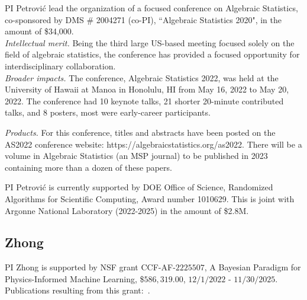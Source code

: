 \documentclass[11pt]{NSFamsart}
\begin{document}
PI Petrovi\'c  lead the organization of a focused 
 conference on Algebraic Statistics, co-sponsored by DMS \# 2004271 (co-PI), ``Algebraic Statistics 2020", in the amount of  \$34,000. 
\\
\emph{Intellectual merit.} Being the third large US-based meeting focused solely on the field of algebraic statistics,  the conference has provided a focused opportunity for interdisciplinary collaboration. 
\\
\emph{Broader impacts.} 
The conference, Algebraic Statistics 2022, was held at the University of Hawaii at Manoa in Honolulu, HI from May 16, 2022 to May 20, 2022. The conference had 10 keynote talks, 21 shorter 20-minute contributed talks, and 8 posters, most were early-career participants. %

\noindent 
\emph{Products.} For this conference, titles and abstracts have been posted on the  AS2022 conference website: https://algebraicstatistics.org/as2022.
There will be a volume in Algebraic Statistics (an MSP journal) to be published in 2023 containing  more than a dozen of these papers. 

PI Petrovi\'c is currently supported by DOE Office of Science, Randomized Algorithms for Scientific Computing, Award number 1010629. This is joint with Argonne National Laboratory (2022-2025) in the amount of \$2.8M.

\subsection*{Zhong} PI Zhong is supported by NSF grant CCF-AF-$2225507$, A Bayesian Paradigm for Physics-Informed Machine Learning, \$$586,319.00$, $12/1/2022$ - $11/30/2025$.  Publications resulting from this grant:~\cite{chen2022using, coutinho2022physicsinformed, ZLABN2023}.
\end{document}

